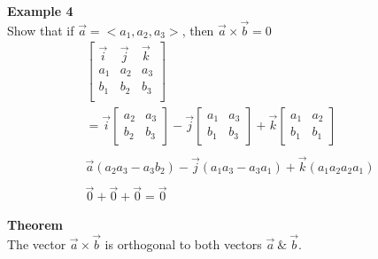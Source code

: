 \documentclass{article}
\begin{document}
  \textbf{Example 4}\\
  Show that if $ \vec{a} = <a_1, a_2, a_3> $, then $ \vec{a} \times \vec{b} =0 $
  \[
    \begin{gathered}
    \begin{bmatrix}
      \vec{i} &\vec{j} &\vec{k}\\
      a_{1} &a_{2} &a_{3}\\
      b_{1} &b_{2} &b_{3}\\ 
    \end{bmatrix}\\
    = \vec{ i } \begin{bmatrix}
      a_2 &a_3\\
      b_2 &b_3
    \end{bmatrix} - 
    \vec{ j } \begin{bmatrix}
      a_1 &a_3\\
      b_1 &b_3
    \end{bmatrix} + 
    \vec{ k } \begin{bmatrix}
      a_1 &a_2\\
      b_1 &b_1
    \end{bmatrix}\\
    ~\\
    \vec{a}(a_{2} a_{3} -a_{3} b_{2} )-\vec{j}(a_{1} a_{3} -a_{3} a_{1} )+ \vec{k}(a_{1} a_{2} a_{2} a_{1} )\\
    ~\\
    \vec{0}+\vec{0}+\vec{0}=\boxed{\vec{0}} 
    \end{gathered}
  \] 
  

  \textbf{Theorem}\\
  The vector $ \vec{ a } \times \vec{ b } $ is orthogonal to both vectors $ \vec{ a } ~ \&~ \vec{ b }   $. 
\end{document}
